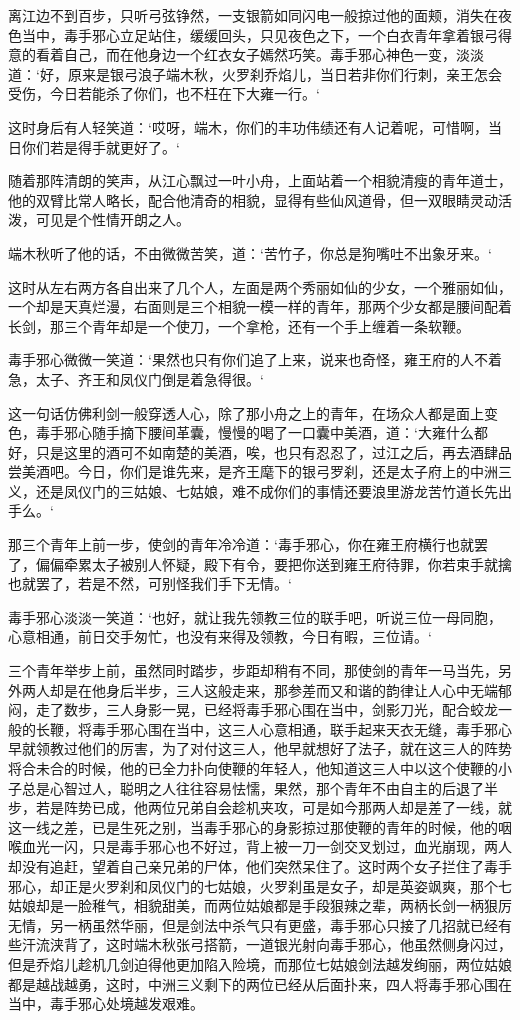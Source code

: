 离江边不到百步，只听弓弦铮然，一支银箭如同闪电一般掠过他的面颊，消失在夜色当中，毒手邪心立足站住，缓缓回头，只见夜色之下，一个白衣青年拿着银弓得意的看着自己，而在他身边一个红衣女子嫣然巧笑。毒手邪心神色一变，淡淡道：‘好，原来是银弓浪子端木秋，火罗刹乔焰儿，当日若非你们行刺，亲王怎会受伤，今日若能杀了你们，也不枉在下大雍一行。‘

这时身后有人轻笑道：‘哎呀，端木，你们的丰功伟绩还有人记着呢，可惜啊，当日你们若是得手就更好了。‘

随着那阵清朗的笑声，从江心飘过一叶小舟，上面站着一个相貌清瘦的青年道士，他的双臂比常人略长，配合他清奇的相貌，显得有些仙风道骨，但一双眼睛灵动活泼，可见是个性情开朗之人。

端木秋听了他的话，不由微微苦笑，道：‘苦竹子，你总是狗嘴吐不出象牙来。‘

这时从左右两方各自出来了几个人，左面是两个秀丽如仙的少女，一个雅丽如仙，一个却是天真烂漫，右面则是三个相貌一模一样的青年，那两个少女都是腰间配着长剑，那三个青年却是一个使刀，一个拿枪，还有一个手上缠着一条软鞭。

毒手邪心微微一笑道：‘果然也只有你们追了上来，说来也奇怪，雍王府的人不着急，太子、齐王和凤仪门倒是着急得很。‘

这一句话仿佛利剑一般穿透人心，除了那小舟之上的青年，在场众人都是面上变色，毒手邪心随手摘下腰间革囊，慢慢的喝了一口囊中美酒，道：‘大雍什么都好，只是这里的酒可不如南楚的美酒，唉，也只有忍忍了，过江之后，再去酒肆品尝美酒吧。今日，你们是谁先来，是齐王麾下的银弓罗刹，还是太子府上的中洲三义，还是凤仪门的三姑娘、七姑娘，难不成你们的事情还要浪里游龙苦竹道长先出手么。‘

那三个青年上前一步，使剑的青年冷冷道：‘毒手邪心，你在雍王府横行也就罢了，偏偏牵累太子被别人怀疑，殿下有令，要把你送到雍王府待罪，你若束手就擒也就罢了，若是不然，可别怪我们手下无情。‘

毒手邪心淡淡一笑道：‘也好，就让我先领教三位的联手吧，听说三位一母同胞，心意相通，前日交手匆忙，也没有来得及领教，今日有暇，三位请。‘

三个青年举步上前，虽然同时踏步，步距却稍有不同，那使剑的青年一马当先，另外两人却是在他身后半步，三人这般走来，那参差而又和谐的韵律让人心中无端郁闷，走了数步，三人身影一晃，已经将毒手邪心围在当中，剑影刀光，配合蛟龙一般的长鞭，将毒手邪心围在当中，这三人心意相通，联手起来天衣无缝，毒手邪心早就领教过他们的厉害，为了对付这三人，他早就想好了法子，就在这三人的阵势将合未合的时候，他的已全力扑向使鞭的年轻人，他知道这三人中以这个使鞭的小子总是心智过人，聪明之人往往容易怯懦，果然，那个青年不由自主的后退了半步，若是阵势已成，他两位兄弟自会趁机夹攻，可是如今那两人却是差了一线，就这一线之差，已是生死之别，当毒手邪心的身影掠过那使鞭的青年的时候，他的咽喉血光一闪，只是毒手邪心也不好过，背上被一刀一剑交叉划过，血光崩现，两人却没有追赶，望着自己亲兄弟的尸体，他们突然呆住了。这时两个女子拦住了毒手邪心，却正是火罗刹和凤仪门的七姑娘，火罗刹虽是女子，却是英姿飒爽，那个七姑娘却是一脸稚气，相貌甜美，而两位姑娘都是手段狠辣之辈，两柄长剑一柄狠厉无情，另一柄虽然华丽，但是剑法中杀气只有更盛，毒手邪心只接了几招就已经有些汗流浃背了，这时端木秋张弓搭箭，一道银光射向毒手邪心，他虽然侧身闪过，但是乔焰儿趁机几剑迫得他更加陷入险境，而那位七姑娘剑法越发绚丽，两位姑娘都是越战越勇，这时，中洲三义剩下的两位已经从后面扑来，四人将毒手邪心围在当中，毒手邪心处境越发艰难。

